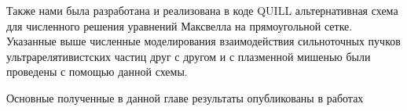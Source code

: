 Также нами была разработана и реализована в коде QUILL альтернативная схема для численного решения уравнений Максвелла на прямоугольной сетке.
Указанные выше численные моделирования взаимодействия сильноточных пучков ультрарелятивистских частиц друг с другом и с плазменной мишенью были проведены с помощью данной схемы.

Основные полученные в данной главе результаты опубликованы в работах~\cite{samsonov2020superluminal, samsonov2021beamstrahlung, filipovic2021effect, samsonov2022simulation,samsonov2020Math, samsonov2021LPHYS}

\FloatBarrier